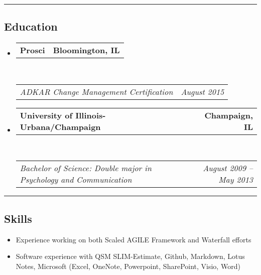 \documentclass[10pt,letterpaper]{article}
\makeatletter
\newcommand{\headerrow}[2]
{\begin{tabular*}{\linewidth}{l@{\extracolsep{\fill}}r}
	#1 &
	#2 \\
\end{tabular*}}
\makeatother
\begin{document}
\hrule
\vspace{-0.4em}
\subsection*{Education}

\begin{itemize}
	\parskip=0.1em

	\item
	\headerrow
		{\textbf{Prosci}}
		{\textbf{Bloomington, IL}}
	\\
	\headerrow
		{\emph{ADKAR Change Management Certification}}
		{\emph{August 2015}}

	\item
	\headerrow
		{\textbf{University of Illinois-Urbana/Champaign}}
		{\textbf{Champaign, IL}}
	\\
	\headerrow
		{\emph{Bachelor of Science: Double major in Psychology and Communication}}
		{\emph{August 2009 -- May 2013}}

\end{itemize}

\hrule
\vspace{-0.4em}
\subsection*{Skills}

\begin{itemize}
        \item Experience working on both Scaled AGILE Framework and Waterfall efforts
        \item Software experience with QSM SLIM-Estimate, Github, Markdown, Lotus Notes, Microsoft (Excel, OneNote, Powerpoint, SharePoint, Visio, Word)
\end{itemize}
\end{document}
